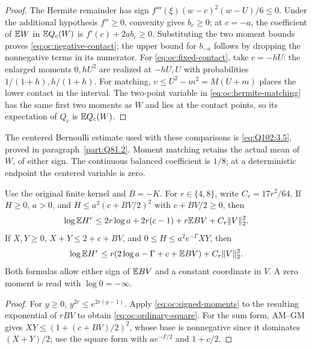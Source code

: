 \begin{proof}
The Hermite remainder has sign
\(f'''(\xi)(w-c)^2(w-U)/6\le0\).
Under the additional hypothesis \(f''\ge0\), convexity gives
\(b_c\ge0\); at \(c=-a\), the coefficient of
\(\mathbb E W\) in \(\mathbb E Q_c(W)\) is \(f'(c)+2ab_c\ge0\).
Substituting the two moment bounds proves
\eqref{eq:oc:negative-contact}; the upper bound for \(b_{-a}\)
follows by dropping the nonnegative terms in its numerator.
For \eqref{eq:oc:fixed-contact}, take \(c=-hU\): the enlarged
moments \(0,hU^2\) are realized at \(-hU,U\) with probabilities
\(1/(1+h),h/(1+h)\).
For matching, \(v\le U^2-m^2=M(U+m)\) places the lower contact
in the interval. The two-point variable in
\eqref{eq:oc:hermite-matching} has the same first two moments
as \(W\) and lies at the contact points, so its expectation of
\(Q_c\) is \(\mathbb E Q_c(W)\).
\end{proof}

The centered Bernoulli estimate used with these comparisons is
\eqref{eq:Q102:3.5}, proved in paragraph~\ref{part:Q81.2}.
Moment matching retains the actual mean of \(W\), of either sign.
The continuous balanced coefficient is \(1/8\); at a deterministic
endpoint the centered variable is zero.

\begin{lemma}
\label{lem:oc:ordinary-comparison}
Use the original finite kernel and \(B=-K\).
For \(r\in\{4,8\}\), write \(C_r=17r^2/64\).
If \(H\ge0\), \(a>0\), and
\(H\le a^2(c+BV/2)^2\) with \(c+BV/2\ge0\), then
\begin{equation}\label{eq:oc:ordinary-square}
 \log\mathbb E H^r\le
 2r\log a+2r(c-1)+r\mathbb E BV+C_r\|V\|_2^2.
\end{equation}
If \(X,Y\ge0\), \(X+Y\le2+c+BV\), and
\(0\le H\le a^2e^{-\Gamma}XY\), then
\begin{equation}\label{eq:oc:ordinary-sum}
 \log\mathbb E H^r\le
 r(2\log a-\Gamma+c+\mathbb E BV)+C_r\|V\|_2^2.
\end{equation}
Both formulas allow either sign of \(\mathbb E BV\) and a constant
coordinate in \(V\). A zero moment is read with \(\log0=-\infty\).
\end{lemma}
\begin{proof}
For \(y\ge0\), \(y^{2r}\le e^{2r(y-1)}\).
Apply \eqref{eq:oc:signed-moments} to the resulting exponential
of \(rBV\) to obtain \eqref{eq:oc:ordinary-square}.
For the sum form, AM--GM gives
\(XY\le(1+(c+BV)/2)^2\), whose base is nonnegative since it
dominates \((X+Y)/2\); use the square form with
\(a e^{-\Gamma/2}\) and \(1+c/2\).
\end{proof}
